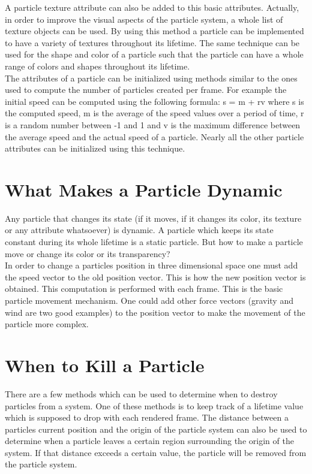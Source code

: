 A particle texture attribute can also be added to this basic attributes. Actually, in order to improve the visual aspects of the particle system, a whole list of texture objects can be used. By using this method a particle can be implemented to have a variety of textures throughout its lifetime. The same technique can be used for the shape and color of a particle such that the particle can have a whole range of colors and shapes throughout its lifetime.\\

The attributes of a particle can be initialized using methods similar to the ones used to compute the number of particles created per frame. For example the initial speed can be computed using the following formula: s = m + rv where s is the computed speed, m is the average of the speed values over a period of time, r is a random number between -1 and 1 and v is the maximum difference between the average speed and the actual speed of a particle. Nearly all the other particle attributes can be initialized using this technique.\\

\newpage
\section{What Makes a Particle Dynamic}
Any particle that changes its state (if it moves, if it changes its color, its texture or any attribute whatsoever) is dynamic. A particle which keeps its state constant during its whole lifetime is a static particle. But how to make a particle move or change its color or its transparency?\\

In order to change a particles position in three dimensional space one must add the speed vector to the old position vector. This is how the new position vector is obtained. This computation is performed with each frame. This is the basic particle movement mechanism. One could add other force vectors (gravity and wind are two good examples) to the position vector to make the movement of the particle more complex.\\

\newpage
\section{When to Kill a Particle}
There are a few methods which can be used to determine when to destroy particles from a system. One of these methods is to keep track of a lifetime value which is supposed to drop with each rendered frame. The distance between a particles current position and the origin of the particle system can also be used to determine when a particle leaves a certain region surrounding the origin of the system. If that distance exceeds a certain value, the particle will be removed from the particle system.\\

